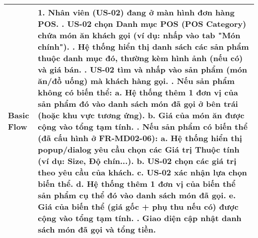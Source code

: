 \begin{longtable}{|m{4cm}|p{11cm}|}
Basic Flow & 1. Nhân viên (US-02) đang ở màn hình đơn hàng POS. \newline 2. US-02 chọn Danh mục POS (POS Category) chứa món ăn khách gọi (ví dụ: nhấp vào tab "Món chính"). \newline 3. Hệ thống hiển thị danh sách các sản phẩm thuộc danh mục đó, thường kèm hình ảnh (nếu có) và giá bán. \newline 4. US-02 tìm và nhấp vào sản phẩm (món ăn/đồ uống) mà khách hàng gọi. \newline 5. \textbf{Nếu sản phẩm không có biến thể:} \newline    a. Hệ thống thêm 1 đơn vị của sản phẩm đó vào danh sách món đã gọi ở bên trái (hoặc khu vực tương ứng). \newline    b. Giá của món ăn được cộng vào tổng tạm tính. \newline 6. \textbf{Nếu sản phẩm có biến thể (đã cấu hình ở FR-MD02-06):} \newline    a. Hệ thống hiển thị popup/dialog yêu cầu chọn các Giá trị Thuộc tính (ví dụ: Size, Độ chín...). \newline    b. US-02 chọn các giá trị theo yêu cầu của khách. \newline    c. US-02 xác nhận lựa chọn biến thể. \newline    d. Hệ thống thêm 1 đơn vị của biến thể sản phẩm cụ thể đó vào danh sách món đã gọi. \newline    e. Giá của biến thể (giá gốc + phụ thu nếu có) được cộng vào tổng tạm tính. \newline 7. Giao diện cập nhật danh sách món đã gọi và tổng tiền. \\
\hline

\end{longtable}
